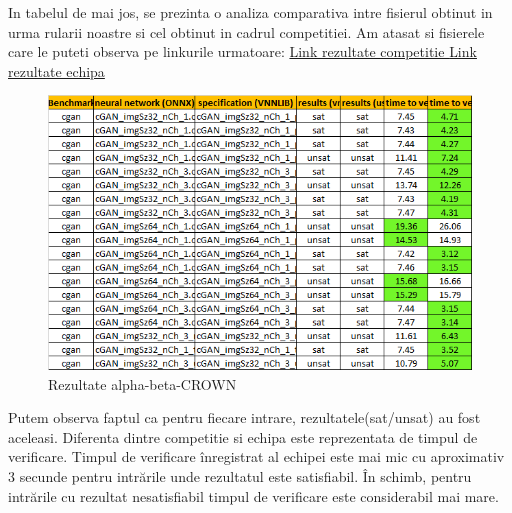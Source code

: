 In tabelul de mai jos, se prezinta o analiza comparativa intre fisierul obtinut in
urma rularii noastre si cel obtinut in cadrul competitiei. Am atasat si fisierele
care le puteti observa pe linkurile urmatoare: 
\href{https://docs.google.com/spreadsheets/d/1iGJHwePCzW0axJIwVes_eiN3R4ppvNu-ndrO_Fy5dL0/edit#gid=1265769327}{Link rezultate competitie }
\href{https://docs.google.com/spreadsheets/d/1kSxunni8qgQLT6ZkCRWvSO2VMy2Hz7qA/edit#gid=1476783028}{Link rezultate echipa}

\begin{figure}[h]
\centering 
\includegraphics[width=0.8\linewidth]{imagini/interpretare rezultate/abC_comp_vs_us.png}
\caption{Rezultate alpha-beta-CROWN}
\label{fig:image1} 
\end{figure}

Putem observa faptul ca pentru fiecare intrare, rezultatele(sat/unsat) au fost aceleasi. Diferenta dintre competitie si echipa este reprezentata de timpul de verificare. Timpul de verificare înregistrat al echipei este mai mic cu aproximativ 3
secunde pentru intrările unde rezultatul este satisfiabil. În schimb, pentru intrările cu rezultat nesatisfiabil timpul de verificare este considerabil mai mare.


